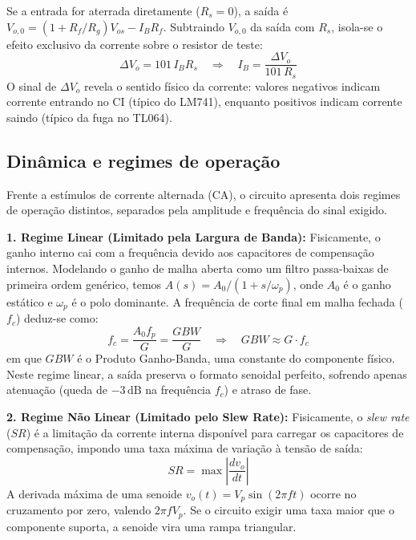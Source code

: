 \documentclass[11pt,a4paper]{article}
\begin{document}
Se a entrada for aterrada diretamente ($R_s=0$), a saída é $V_{o,0} = (1+R_f/R_g)V_{os} - I_BR_f$. Subtraindo $V_{o,0}$ da saída com $R_s$, isola-se o efeito exclusivo da corrente sobre o resistor de teste:
\begin{equation}
\Delta V_o = 101\,I_BR_s \quad\Rightarrow\quad I_B = \frac{\Delta V_o}{101\,R_s}
\label{eq:ib}
\end{equation}
O sinal de $\Delta V_o$ revela o sentido físico da corrente: valores negativos indicam corrente entrando no CI (típico do LM741), enquanto positivos indicam corrente saindo (típico da fuga no TL064).

\subsection{Dinâmica e regimes de operação}

Frente a estímulos de corrente alternada (CA), o circuito apresenta dois regimes de operação distintos, separados pela amplitude e frequência do sinal exigido.

\textbf{1. Regime Linear (Limitado pela Largura de Banda):}
Fisicamente, o ganho interno cai com a frequência devido aos capacitores de compensação internos. Modelando o ganho de malha aberta como um filtro passa-baixas de primeira ordem genérico, temos $A(s) = A_0 / (1 + s/\omega_p)$, onde $A_0$ é o ganho estático e $\omega_p$ é o polo dominante. A frequência de corte final em malha fechada ($f_c$) deduz-se como:
\begin{equation}
f_c = \frac{A_0 f_p}{G} = \frac{GBW}{G} \quad\Rightarrow\quad GBW \approx G \cdot f_c
\label{eq:fc_gbw}
\end{equation}
em que $GBW$ é o Produto Ganho-Banda, uma constante do componente físico. Neste regime linear, a saída preserva o formato senoidal perfeito, sofrendo apenas atenuação (queda de $-3\,\text{dB}$ na frequência $f_c$) e atraso de fase.

\textbf{2. Regime Não Linear (Limitado pelo Slew Rate):}
Fisicamente, o \textit{slew rate} ($SR$) é a limitação da corrente interna disponível para carregar os capacitores de compensação, impondo uma taxa máxima de variação à tensão de saída:
\begin{equation}
SR = \max\left|\frac{dv_o}{dt}\right|
\label{eq:sr}
\end{equation}
A derivada máxima de uma senoide $v_o(t) = V_p\sin(2\pi ft)$ ocorre no cruzamento por zero, valendo $2\pi f V_p$. Se o circuito exigir uma taxa maior que o componente suporta, a senoide vira uma rampa triangular. 
\end{document}
